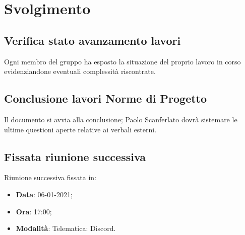 \documentclass[]{article}
\begin{document}
	\newpage

	\section{Svolgimento}
		\subsection{Verifica stato avanzamento lavori}
		Ogni membro del gruppo ha esposto la situazione del proprio lavoro in corso evidenziandone eventuali complessità riscontrate.

		\subsection{Conclusione lavori Norme di Progetto}
		Il documento  si avvia alla conclusione; Paolo Scanferlato dovrà sistemare le ultime questioni aperte relative ai verbali esterni.

		\subsection{Fissata riunione successiva}
		Riunione successiva fissata in:
		\begin{itemize}
			\item \textbf{Data}: 06-01-2021;
			\item \textbf{Ora}: 17:00;
			\item \textbf{Modalità}: Telematica: Discord.
		\end{itemize}
	
	\newpage
	
\end{document}
